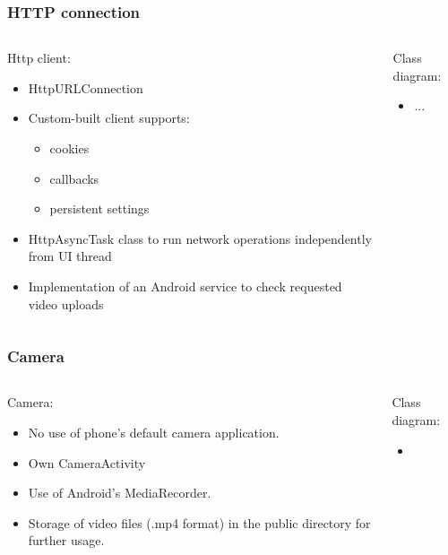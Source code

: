 \begin{frame}	
	\frametitle{HTTP connection}
	\begin{columns}[t]
		\begin{column}[t]{0.5\linewidth}
			Http client:
			\begin{itemize}
				\item HttpURLConnection
				\item Custom-built client supports:
				\begin{itemize}
					\item cookies
					\item callbacks
					\item persistent settings					
				\end{itemize} 
				\item HttpAsyncTask class to run network operations independently from UI thread
				\item Implementation of an Android service to check requested video uploads
			\end{itemize}
		\end{column}
		\begin{column}[t]{0.5\linewidth}
			Class diagram:
			\begin{itemize}
				\item ...
			\end{itemize}
			
		\end{column}		
	\end{columns}	
\end{frame}

\begin{frame}	
	\frametitle{Camera}
	\begin{columns}[t]
		\begin{column}[t]{0.5\linewidth}
			Camera:
			\begin{itemize}
				\item No use of phone's default camera application.
				\item Own CameraActivity
				\item Use of Android's MediaRecorder.
				\item Storage of video files (.mp4 format) in the public directory for further usage. 
			\end{itemize}
		\end{column}
		\begin{column}[t]{0.5\linewidth}
			Class diagram:
			\begin{itemize}
				\item 
			\end{itemize}
			
		\end{column}		
	\end{columns}	
\end{frame}

